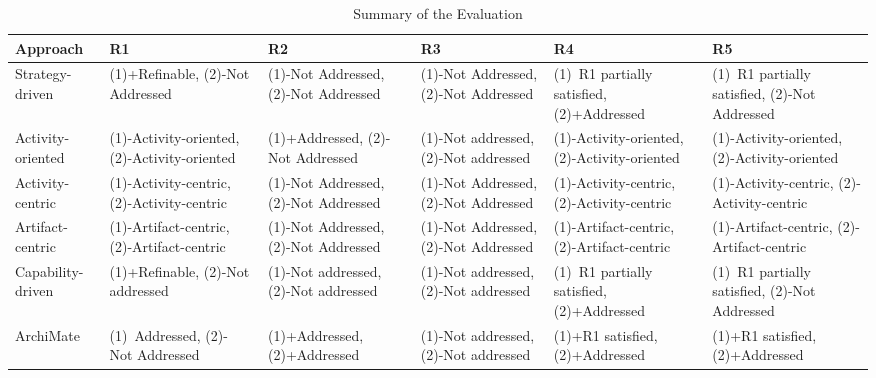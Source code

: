 \begin{table}[]
	\scriptsize 
	\centering
	\begin{tabular}{p{2cm}p{2.1cm}p{2.3cm}p{2.3cm}p{2.3cm}p{2.3cm}}
	\toprule
		Approach & R1               & R2               & R3         & R4       & R5        \\
	\midrule
	Strategy-driven& (1)+Refinable, (2)-Not Addressed& (1)-Not Addressed, (2)-Not Addressed& (1)-Not Addressed, (2)-Not Addressed& (1)~R1 partially satisfied, (2)+Addressed& (1)~R1 partially satisfied, (2)-Not Addressed \\
	Activity-oriented & (1)-Activity-oriented, (2)-Activity-oriented &(1)+Addressed, (2)- Not Addressed& (1)-Not addressed, (2)-Not addressed&(1)-Activity-oriented, (2)-Activity-oriented&(1)-Activity-oriented, (2)-Activity-oriented \\
	Activity-centric & (1)-Activity-centric, (2)-Activity-centric  & (1)-Not Addressed, (2)-Not Addressed  & (1)-Not Addressed, (2)-Not Addressed&  (1)-Activity-centric, (2)-Activity-centric &  (1)-Activity-centric, (2)-Activity-centric \\
	Artifact-centric    & (1)-Artifact-centric, (2)-Artifact-centric  & (1)-Not Addressed, (2)-Not Addressed  & (1)-Not Addressed, (2)-Not Addressed  & (1)-Artifact-centric, (2)-Artifact-centric & (1)-Artifact-centric, (2)-Artifact-centric  \\ 
	Capability-driven   & (1)+Refinable, (2)-Not addressed & (1)-Not addressed, (2)-Not addressed   & (1)-Not addressed, (2)-Not addressed  & (1)~R1 partially satisfied, (2)+Addressed  & (1)~R1 partially satisfied, (2)-Not Addressed  \\
	ArchiMate  & (1)~Addressed, (2)- Not Addressed & (1)+Addressed, (2)+Addressed & (1)-Not addressed, (2)-Not addressed  & (1)+R1 satisfied, (2)+Addressed & (1)+R1 satisfied, (2)+Addressed\\
	\bottomrule   
	\end{tabular}
	\caption{Summary of the Evaluation}
	\label{tab:evaluationoftheapproach}  
\end{table}



 


